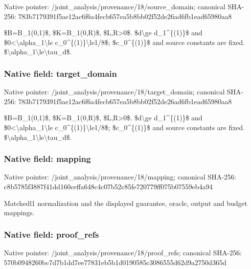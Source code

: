 \documentclass[10pt,a4paper]{article}
\begin{document}
Native pointer: /joint\_analysis/provenan\allowbreak{}ce/18/source\_domain; canonical SHA-256: 783b7179391f5ae12ac6f6a4\allowbreak{}fecb657ea5b8bb02f52de26a\allowbreak{}d6fb1ead65980aa8


\$B=B\_1(0,1)\$, \$K=B\_1(0,R)\$, \$L,R>0\$. \$d\textbackslash{}ge d\_1\textasciicircum{}\{(1)\}\$ and \$0<\textbackslash{}alpha\_1\textbackslash{}le c\_0\textasciicircum{}\{(1)\}\textbackslash{}le1/8\$; \$c\_0\textasciicircum{}\{(1)\}\$ and source constants are fixed. \$\textbackslash{}alpha\_1\textbackslash{}le\textbackslash{}tau\_d\$.


\subsubsection{Native field: target\_domain}


Native pointer: /joint\_analysis/provenan\allowbreak{}ce/18/target\_domain; canonical SHA-256: 783b7179391f5ae12ac6f6a4\allowbreak{}fecb657ea5b8bb02f52de26a\allowbreak{}d6fb1ead65980aa8


\$B=B\_1(0,1)\$, \$K=B\_1(0,R)\$, \$L,R>0\$. \$d\textbackslash{}ge d\_1\textasciicircum{}\{(1)\}\$ and \$0<\textbackslash{}alpha\_1\textbackslash{}le c\_0\textasciicircum{}\{(1)\}\textbackslash{}le1/8\$; \$c\_0\textasciicircum{}\{(1)\}\$ and source constants are fixed. \$\textbackslash{}alpha\_1\textbackslash{}le\textbackslash{}tau\_d\$.


\subsubsection{Native field: mapping}


Native pointer: /joint\_analysis/provenance/18/mapping; canonical SHA-256: c8b5785f3887f41dd160ceff\allowbreak{}a648c4c07b52c85fe720779f\allowbreak{}f075b07559eb4a94


Matchedl1 normalization and the displayed guarantee, oracle, output and budget mappings.


\subsubsection{Native field: proof\_refs}


Native pointer: /joint\_analysis/provenan\allowbreak{}ce/18/proof\_refs; canonical SHA-256: 570b0948260bc7d7b1dd7ee7\allowbreak{}7831eb5b1d0190585c308655\allowbreak{}5d62d9a2750d365d
\end{document}
